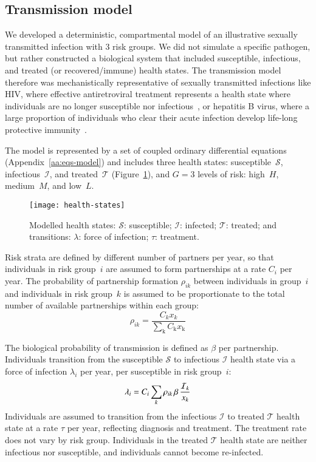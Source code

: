 \subsection{Transmission model}\label{ss:model-sim}
We developed a deterministic, compartmental model of an illustrative
sexually transmitted infection with 3 risk groups.
We did not simulate a specific pathogen, but rather constructed a biological system
that included susceptible, infectious, and treated (or recovered/immune) health states.
The transmission model therefore was mechanistically representative of
sexually transmitted infections like
HIV, where effective antiretroviral treatment represents a health state where
individuals are no longer susceptible nor infectious~\citep{Maartens2014}, or
hepatitis B virus, where a large proportion of individuals who clear their acute infection
develop life-long protective immunity~\citep{Ganem2004}.
\par
The model is represented by a set of coupled ordinary differential equations
(Appendix~\ref{aa:eqs-model}) and includes
three health states:
susceptible~$\mathcal{S}$, infectious~$\mathcal{I}$, and treated~$\mathcal{T}$
(Figure~\ref{fig:health-states}),
and $G = 3$ levels of risk:
high~$H$, medium~$M$, and low~$L$.
\begin{figure}
  \centerline{\texttt{[image: health-states]}}
  \caption{Modelled health states:
    $\mathcal{S}$: susceptible;
    $\mathcal{I}$: infected;
    $\mathcal{T}$: treated;
    and transitions:
    $\lambda$: force of infection;
    $\tau$: treatment.}
  \label{fig:health-states}
\end{figure}
Risk strata are defined by different number of partners per year,
so that individuals in risk group~$i$ are assumed to
form partnerships at a rate $C_{i}$ per year.
The probability of partnership formation $\rho_{ik}$ between individuals in group~$i$
and individuals in risk group~$k$ is assumed to be
proportionate to the total number of available partnerships within each group:
\begin{equation}
\rho_{ik} = \frac
{C_k x_k}
{\sum_{\mathrm{k}}C_{\mathrm{k}} x_{\mathrm{k}}}
\label{eq:rho}
\end{equation}
\par
The biological probability of transmission is defined as $\beta$ per partnership.
Individuals transition from the
susceptible $\mathcal{S}$ to infectious $\mathcal{I}$ health state
via a force of infection $\lambda_i$ per year, per susceptible in risk group~$i$:
\begin{equation}
\lambda_{i} =
C_{i} \sum_k \rho_{ik} \thinspace  \beta \thinspace \frac{\mathcal{I}_k}{x_k}
\label{eq:foi}
\end{equation}
Individuals are assumed to transition from the
infectious $\mathcal{I}$ to treated $\mathcal{T}$ health state
at a rate $\tau$ per year, reflecting diagnosis and treatment.
The treatment rate does not vary by risk group.
Individuals in the treated $\mathcal{T}$ health state are neither infectious nor susceptible,
and individuals cannot become re-infected.
